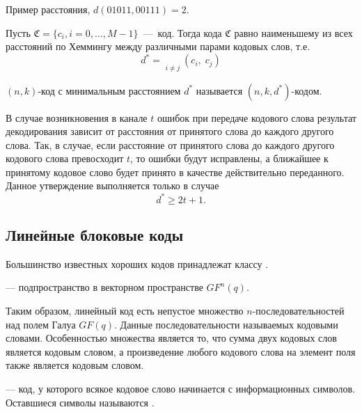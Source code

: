 Пример расстояния, $d(01011, 00111)=2$.

\begin{definition} 
Пусть $\mathfrak{C}=\{c_i, i=0, \ldots, M - 1\}$~---~код. Тогда  кода $\mathfrak{C}$ равно наименьшему из всех расстояний по Хеммингу между различными парами 
кодовых слов, т.е. 
$$ d^*  = \mathop {\mathop {\min }\limits_{c_i ,\,c_j  \in \mathfrak{C}} }\limits_{i \ne j}
\left( {c_i ,\;c_j } \right) $$ 
\end{definition}

\begin{definition} 
$(n, k)$-код с минимальным расстоянием $d^*$ называется $(n, k, d^*)$-кодом.
\end{definition}

В случае возникновения в канале $t$ ошибок при передаче кодового слова результат декодирования зависит
от расстояния от принятого слова до каждого другого слова. Так, в случае, если расстояние от принятого
слова до каждого другого кодового слова превосходит $t$, то ошибки будут исправлены, а ближайшее
к принятому кодовое слово будет принято в качестве действительно переданного. Данное утверждение
выполняется только в случае $$d^* \geq 2t+1.$$

\subsection{Линейные блоковые коды}

Большинство известных хороших кодов принадлежат классу .

\begin{definition} 
 --- подпространство в векторном пространстве $GF^n(q)$.
\end{definition}

Таким образом, линейный код есть непустое множество $n$-последовательностей над
полем Галуа $GF(q)$. Данные последовательности называемых кодовыми словами. Особенностью множества
является то, что сумма двух кодовых слов является кодовым словом, а произведение любого кодового слова на элемент поля также является кодовым словом.

\begin{definition}
 --- код, у которого всякое кодовое слово начинается с информационных символов. Оставшиеся символы называются .
\end{definition}

